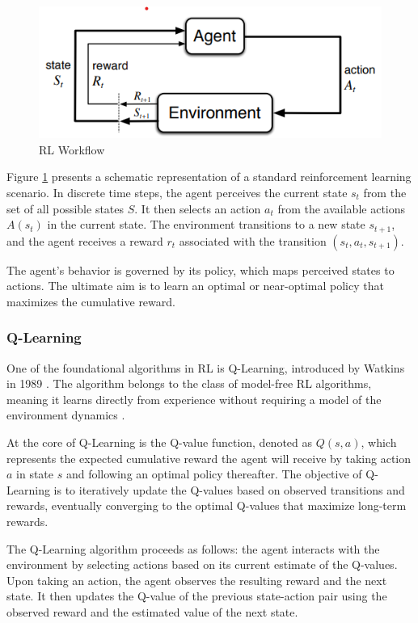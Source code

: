 \begin{figure}[ht]
    \centering
    \includegraphics[scale=1]{images/rl-workflow.png}
    \caption{RL Workflow}
    \label{fig:sutton_rl_workflow}
\end{figure}

Figure \ref{fig:sutton_rl_workflow} presents a schematic representation of a standard reinforcement learning scenario. In discrete time steps, the agent perceives the current state $s_t$ from the set of all possible states $S$. It then selects an action $a_t$ from the available actions $A(s_t)$ in the current state. The environment transitions to a new state $s_{t+1}$, and the agent receives a reward $r_t$ associated with the transition $(s_t, a_t, s_{t+1})$.

The agent's behavior is governed by its policy, which maps perceived states to actions. The ultimate aim is to learn an optimal or near-optimal policy that maximizes the cumulative reward. 


\subsubsection*{Q-Learning}

One of the foundational algorithms in RL is Q-Learning, introduced by Watkins in 1989 \cite{watkins1989learning}. The algorithm belongs to the class of model-free RL algorithms, meaning it learns directly from experience without requiring a model of the environment dynamics \cite{russel2020ai}.

At the core of Q-Learning is the Q-value function, denoted as $Q(s, a)$, which represents the expected cumulative reward the agent will receive by taking action $a$ in state $s$ and following an optimal policy thereafter. The objective of Q-Learning is to iteratively update the Q-values based on observed transitions and rewards, eventually converging to the optimal Q-values that maximize long-term rewards.

The Q-Learning algorithm proceeds as follows: the agent interacts with the environment by selecting actions based on its current estimate of the Q-values. Upon taking an action, the agent observes the resulting reward and the next state. It then updates the Q-value of the previous state-action pair using the observed reward and the estimated value of the next state.


